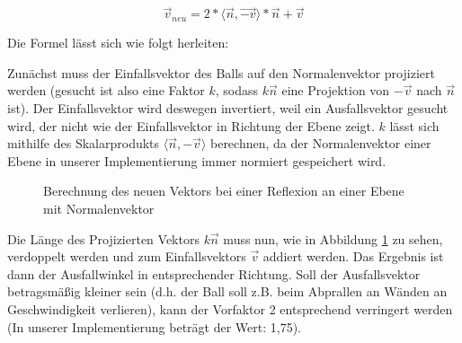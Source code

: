 \begin{equation}	
\label{reflexion}
	\vec{v}_{neu} = 2* \langle \vec{n},\vec{-v} \rangle * \vec{n} + \vec{v}
\end{equation}

Die Formel lässt sich wie folgt herleiten:

Zunächst muss der Einfallsvektor des Balls auf den Normalenvektor projiziert werden (gesucht ist also eine Faktor $k$, sodass $k\vec{n}$ eine Projektion von $-\vec{v}$ nach $\vec{n}$ ist). Der Einfallsvektor wird deswegen invertiert, weil ein Ausfallsvektor gesucht wird, der nicht wie der Einfallsvektor in Richtung der Ebene zeigt. $k$ lässt sich mithilfe des Skalarprodukts $\langle\vec{n},-\vec{v}\rangle$ berechnen, da der Normalenvektor einer Ebene in unserer Implementierung immer normiert gespeichert wird.



    \begin{figure}
	\begin{center}
    \hspace{1.5cm}%
    \caption[Weitere Testbilder]{Berechnung des neuen Vektors bei einer Reflexion an einer Ebene mit Normalenvektor}
        \label{fig_reflexion}
	\end{center}
    \end{figure}
    
Die Länge des Projizierten Vektors $k\vec{n}$ muss nun, wie in Abbildung \ref{fig_reflexion} zu sehen, verdoppelt werden und zum Einfallsvektors $\vec{v}$ addiert werden. Das Ergebnis ist dann der Ausfallwinkel in entsprechender Richtung. Soll der Ausfallsvektor betragsmäßig kleiner sein (d.h. der Ball soll z.B. beim Abprallen an Wänden an Geschwindigkeit verlieren), kann der Vorfaktor 2 entsprechend verringert werden (In unserer Implementierung beträgt der Wert: 1,75).